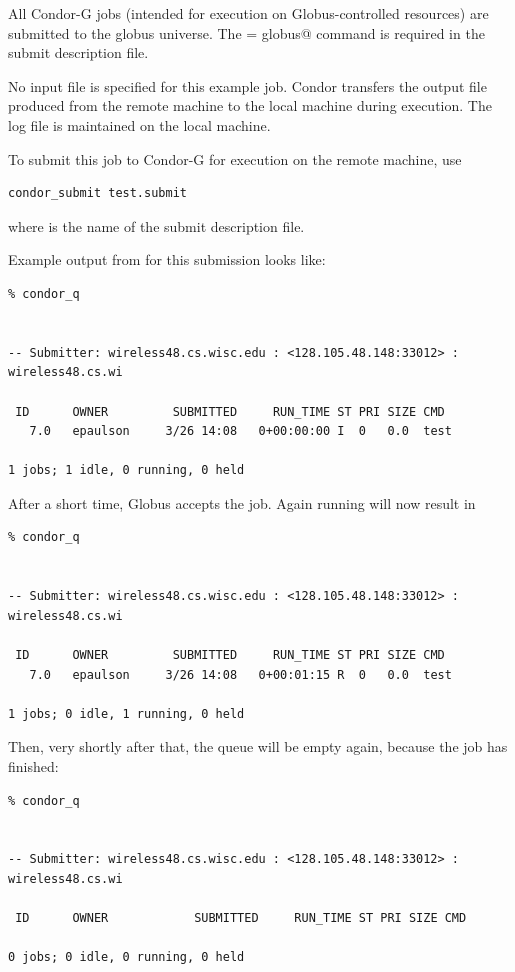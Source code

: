 All Condor-G jobs (intended for execution on Globus-controlled
resources) are submitted to the globus universe.
The \verb@universe = globus@ command is required
in the submit description file.

No input file is specified for this example job.
Condor transfers the output file produced 
from the remote machine to the local machine during execution.
The log file is maintained on the local machine.

To submit this job to Condor-G for execution on the
remote machine, use
\begin{verbatim}
condor_submit test.submit
\end{verbatim}
where  is the name of the submit description file.

Example output from 
 for this submission looks like:
\begin{verbatim}
% condor_q


-- Submitter: wireless48.cs.wisc.edu : <128.105.48.148:33012> : wireless48.cs.wi

 ID      OWNER         SUBMITTED     RUN_TIME ST PRI SIZE CMD
   7.0   epaulson     3/26 14:08   0+00:00:00 I  0   0.0  test

1 jobs; 1 idle, 0 running, 0 held
\end{verbatim}

After a short time, Globus accepts the job.
Again running  will now result in

\begin{verbatim}
% condor_q


-- Submitter: wireless48.cs.wisc.edu : <128.105.48.148:33012> : wireless48.cs.wi

 ID      OWNER         SUBMITTED     RUN_TIME ST PRI SIZE CMD
   7.0   epaulson     3/26 14:08   0+00:01:15 R  0   0.0  test

1 jobs; 0 idle, 1 running, 0 held
\end{verbatim}

Then, very shortly after that, the queue will be empty again,
because the job has finished:

\begin{verbatim}
% condor_q


-- Submitter: wireless48.cs.wisc.edu : <128.105.48.148:33012> : wireless48.cs.wi

 ID      OWNER            SUBMITTED     RUN_TIME ST PRI SIZE CMD

0 jobs; 0 idle, 0 running, 0 held
\end{verbatim}


